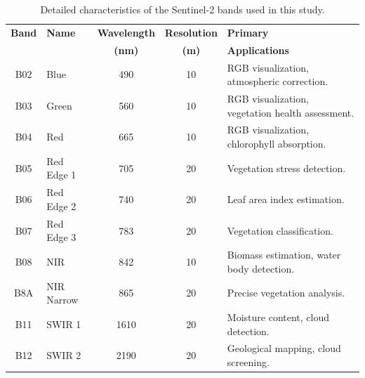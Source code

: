 \begin{table}[H]
\centering
\caption{Detailed characteristics of the Sentinel-2 bands used in this study.}
\label{tab:sentinel2_bands_detailed}
\renewcommand{\arraystretch}{1.3}
\begin{tabular}{|c|l|c|c|p{5.5cm}|}
\hline
\textbf{Band} & \textbf{Name} & \textbf{Wavelength} & \textbf{Resolution} & \textbf{Primary} \\
             &               & \textbf{(nm)}       & \textbf{(m)}        & \textbf{Applications} \\
\hline
B02 & Blue         & 490  & 10 & RGB visualization, atmospheric correction. \\
\hline
B03 & Green        & 560  & 10 & RGB visualization, vegetation health assessment. \\
\hline
B04 & Red          & 665  & 10 & RGB visualization, chlorophyll absorption. \\
\hline
B05 & Red Edge 1   & 705  & 20 & Vegetation stress detection. \\
\hline
B06 & Red Edge 2   & 740  & 20 & Leaf area index estimation. \\
\hline
B07 & Red Edge 3   & 783  & 20 & Vegetation classification. \\
\hline
B08 & NIR          & 842  & 10 & Biomass estimation, water body detection. \\
\hline
B8A & NIR Narrow   & 865  & 20 & Precise vegetation analysis. \\
\hline
B11 & SWIR 1       & 1610 & 20 & Moisture content, cloud detection. \\
\hline
B12 & SWIR 2       & 2190 & 20 & Geological mapping, cloud screening. \\
\hline
\end{tabular}
\end{table}
